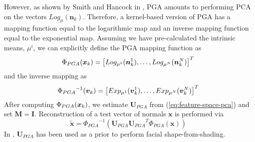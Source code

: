 However, as shown by Smith and Hancock in \cite{RefWorks:86}, PGA amounts to performing PCA on the vectors $Log_\mu(\boldsymbol{n}_k)$. Therefore, a kernel-based version of PGA has a mapping function equal to the logarithmic map and an inverse mapping function equal to the exponential map. Assuming we have pre-calculated the intrinsic means, $\mu^i$, we can explicitly define the PGA mapping function as 
\begin{equation}\label{eq:pga-kernel}
    \pga = \left[ Log_{\mu^1}(\boldsymbol{n}_k^1), \ldots, Log_{\mu^N}(\boldsymbol{n}_k^N) \right]^T
\end{equation}
and the inverse mapping as 
\begin{equation}\label{eq:inv-pga-kernel}
    \invpga = \left[ Exp_{\mu^1}(\boldsymbol{v}_k^1), \ldots, Exp_{\mu^N}(\boldsymbol{v}_k^N) \right]^T
\end{equation}
After computing $\Phi_{PGA}(\boldsymbol{x}_k)$, we estimate $\boldsymbol{U}_{PGA}$ from (\ref{eq:feature-space-pca}) and set $\boldsymbol{M} = \boldsymbol{I}$. Reconstruction of a test vector of normals $\boldsymbol{x}$ is performed via
\begin{equation}\label{eq:pga-reconstruction}
   \tilde{\boldsymbol{x}} = {\Phi_{PGA}}^{-1} \left( \boldsymbol{U}_{PGA} {\boldsymbol{U}_{PGA}}^T \Phi_{PGA}(\boldsymbol{x}) \right)
\end{equation}
In \cite{RefWorks:86}, $\boldsymbol{U}_{PGA}$ has been used as a prior to perform facial shape-from-shading.

